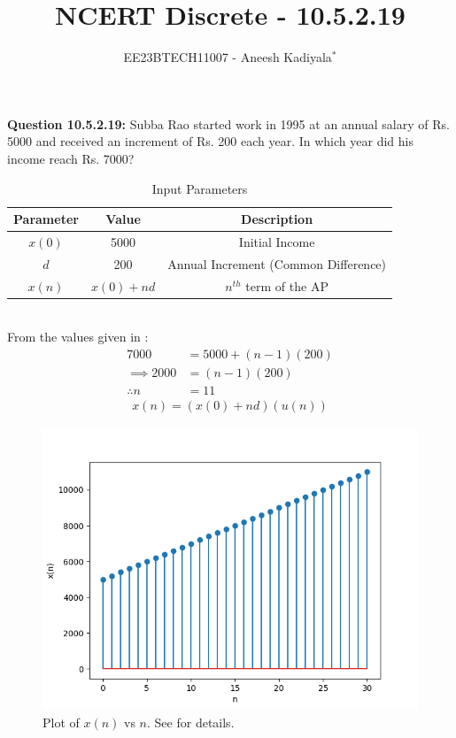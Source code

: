 \documentclass[journal,12pt,twocolumn]{IEEEtran}
\theoremstyle{remark}
\begin{document}

\vspace{3cm}

\title{NCERT Discrete - 10.5.2.19}
\author{EE23BTECH11007 - Aneesh Kadiyala$^{*}$%
}
\maketitle
\newpage
\bigskip

\renewcommand{\thefigure}{\theenumi}
\renewcommand{\thetable}{\theenumi}

\vspace{3cm}
\textbf{Question 10.5.2.19:} Subba Rao started work in 1995 at an annual salary of Rs. 5000 and received an increment of Rs. 200 each year. In which year did his income reach Rs. 7000?
\\
\solution
\begin{table}[h!]
    \centering
    \caption{Input Parameters}
    \label{tab:1}
    \begin{tabular}{ | c | c | c | }
        \hline
        Parameter & Value & Description \\
        \hline
        $x(0)$ & 5000 & Initial Income \\
        \hline
        $d$ & 200 & Annual Increment (Common Difference) \\
        \hline
        $x(n)$ & $x(0) + nd$ & $n^{th}$ term of the AP \\
        \hline
    \end{tabular}
\end{table} \\
From the values given in :
\begin{align}
7000 &= 5000 + (n - 1)(200) \\
\implies 2000 &= (n - 1)(200) \\
\therefore n &= 11
\end{align}
\begin{align}
x(n) = (x(0) + nd)(u(n))
\end{align}
\begin{figure}[h!]
    \centering
    \includegraphics[width=\columnwidth]{figs/10_5_2_19.png}
    \caption{Plot of $x(n)$ vs $n$. See  for details.}
    \label{fig:1}
\end{figure} \\
\end{document}
